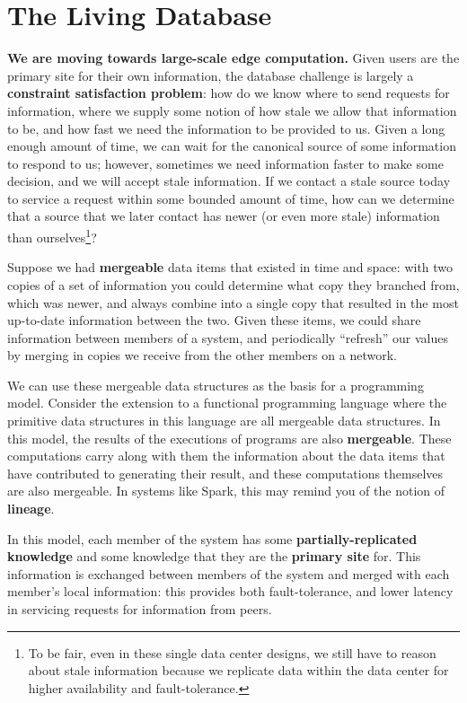 \documentclass[english]{article}
\begin{document}
\section{The Living Database}
\textbf{We are moving towards large-scale edge computation.}  Given users are the primary site for their own information, the database challenge is largely a \textbf{constraint satisfaction problem}: how do we know where to send requests for information, where we supply some notion of how stale we allow that information to be, and how fast we need the information to be provided to us.  Given a long enough amount of time, we can wait for the canonical source of some information to respond to us; however, sometimes we need information faster to make some decision, and we will accept stale information.  If we contact a stale source today to service a request within some bounded amount of time, how can we determine that a source that we later contact has newer (or even more stale) information than ourselves\footnote{To be fair, even in these single data center designs, we still have to reason about stale information because we replicate data within the data center for higher availability and fault-tolerance.}?

Suppose we had \textbf{mergeable} data items that existed in time and space: with two copies of a set of information you could determine what copy they branched from, which was newer, and always combine into a single copy that resulted in the most up-to-date information between the two.  Given these items, we could share information between members of a system, and periodically ``refresh'' our values by merging in copies we receive from the other members on a network.

We can use these mergeable data structures as the basis for a programming model.  Consider the extension to a functional programming language where the primitive data structures in this language are all mergeable data structures.  In this model, the results of the executions of programs are also \textbf{mergeable}.  These computations carry along with them the information about the data items that have contributed to generating their result, and these computations themselves are also mergeable.  In systems like Spark, this may remind you of the notion of \textbf{lineage}.

In this model, each member of the system has some \textbf{partially-replicated knowledge} and some knowledge that they are the \textbf{primary site} for.  This information is exchanged between members of the system and merged with each member's local information: this provides both fault-tolerance, and lower latency in servicing requests for information from peers.
\end{document}
